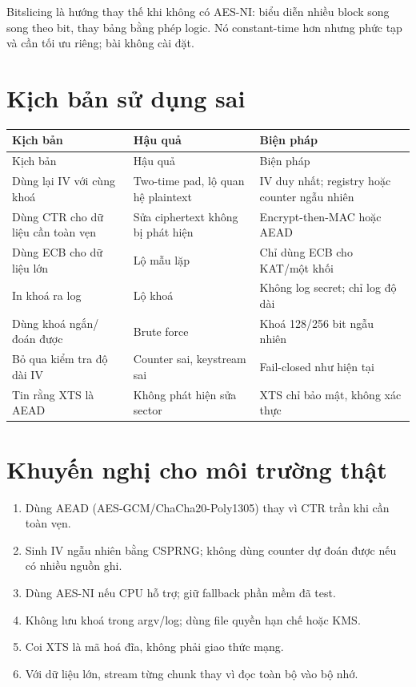\documentclass[12pt,a4paper,oneside]{report}
\begin{document}
Bitslicing là hướng thay thế khi không có AES-NI: biểu diễn nhiều block song song theo bit, thay bảng bằng phép logic. Nó constant-time hơn nhưng phức tạp và cần tối ưu riêng; bài không cài đặt.


\section{Kịch bản sử dụng sai}


\begin{longtable}{p{}p{}p{}}
\toprule
Kịch bản & Hậu quả & Biện pháp \\
\midrule
\endfirsthead
\toprule
Kịch bản & Hậu quả & Biện pháp \\
\midrule
\endhead
Dùng lại IV với cùng khoá & Two-time pad, lộ quan hệ plaintext & IV duy nhất; registry hoặc counter ngẫu nhiên \\
Dùng CTR cho dữ liệu cần toàn vẹn & Sửa ciphertext không bị phát hiện & Encrypt-then-MAC hoặc AEAD \\
Dùng ECB cho dữ liệu lớn & Lộ mẫu lặp & Chỉ dùng ECB cho KAT/một khối \\
In khoá ra log & Lộ khoá & Không log secret; chỉ log độ dài \\
Dùng khoá ngắn/đoán được & Brute force & Khoá 128/256 bit ngẫu nhiên \\
Bỏ qua kiểm tra độ dài IV & Counter sai, keystream sai & Fail-closed như hiện tại \\
Tin rằng XTS là AEAD & Không phát hiện sửa sector & XTS chỉ bảo mật, không xác thực \\
\bottomrule
\end{longtable}


\section{Khuyến nghị cho môi trường thật}


\begin{enumerate}[leftmargin=*]
\item Dùng AEAD (AES-GCM/ChaCha20-Poly1305) thay vì CTR trần khi cần toàn vẹn.
\item Sinh IV ngẫu nhiên bằng CSPRNG; không dùng counter dự đoán được nếu có nhiều nguồn ghi.
\item Dùng AES-NI nếu CPU hỗ trợ; giữ fallback phần mềm đã test.
\item Không lưu khoá trong argv/log; dùng file quyền hạn chế hoặc KMS.
\item Coi XTS là mã hoá đĩa, không phải giao thức mạng.
\item Với dữ liệu lớn, stream từng chunk thay vì đọc toàn bộ vào bộ nhớ.
\end{enumerate}
\end{document}
